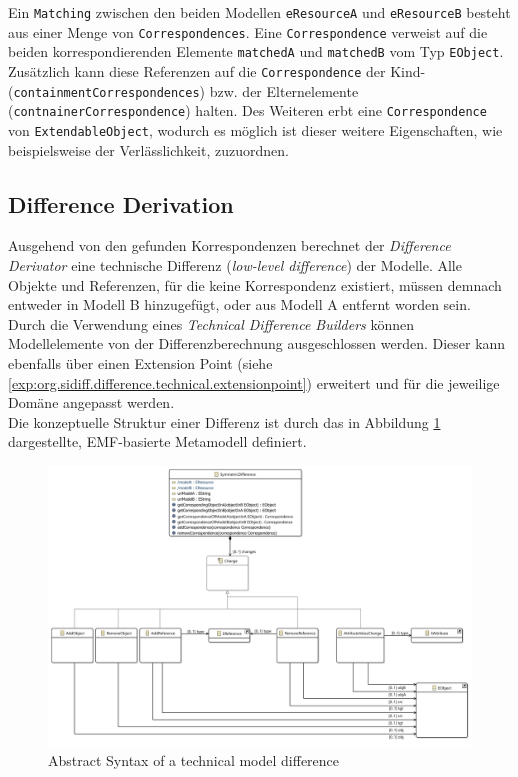 Ein \texttt{Matching} zwischen den beiden Modellen \texttt{eResourceA} und \texttt{eResourceB} besteht aus einer Menge von \texttt{Correspondences}. Eine \texttt{Correspondence} verweist auf die beiden korrespondierenden Elemente \texttt{matchedA} und \texttt{matchedB} vom Typ \texttt{EObject}. Zusätzlich kann diese Referenzen auf die \texttt{Correspondence} der Kind- (\texttt{containmentCorrespondences}) bzw. der Elternelemente (\texttt{con\-tnai\-ner\-Correspondence}) halten.
Des Weiteren erbt eine \texttt{Cor\-res\-pon\-dence} von \texttt{ExtendableObject}, wodurch es möglich ist dieser weitere Eigenschaften, wie beispielsweise der Verlässlichkeit, zuzuordnen.\\

\newpage


\subsection{Difference Derivation}
Ausgehend von den gefunden Korrespondenzen berechnet der \textit{Difference Derivator} eine technische Differenz (\textit{low-level difference}) der Mo\-del\-le.
Alle Objekte und Referenzen, für die keine Korrespondenz existiert, müssen demnach entweder in Modell B hinzugefügt, oder aus Modell A entfernt worden sein. 
Durch die Verwendung eines \textit{Technical Difference Builders} können Modellelemente von der Differenzberechnung ausgeschlossen werden.
Dieser kann ebenfalls über einen Extension Point (siehe \ref{exp:org.sidiff.difference.technical.extensionpoint}) erweitert und für die jeweilige Domäne angepasst werden.\\
Die konzeptuelle Struktur einer Differenz ist durch das in Abbildung \ref{fig:technical_model} dargestellte, EMF-basierte Metamodell definiert. 

\begin{figure}[h!]
\centering
\includegraphics[width=\textwidth]{images/architecture/technical_model}
\caption{Abstract Syntax of a technical model difference}
\label{fig:technical_model}
\end{figure}

